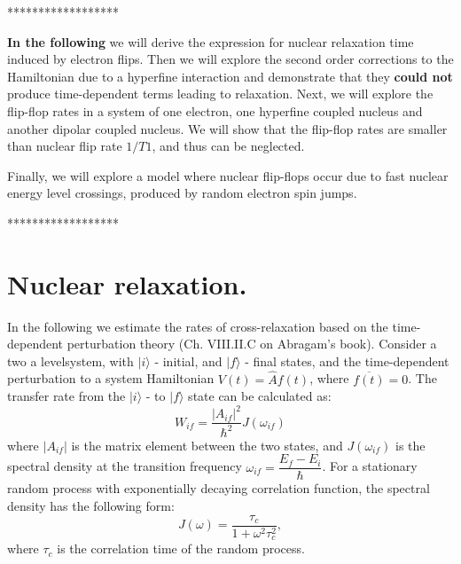 \documentclass[a4paper, 12pt]{article}
\begin{document}
******************

\textbf{In the following} we will derive the expression for nuclear relaxation time induced by electron flips. Then we will explore the second order corrections to the Hamiltonian due to a hyperfine interaction and demonstrate that they \textbf{could not} produce time-dependent terms leading to relaxation. Next, we will explore the flip-flop rates in a system of one electron, one hyperfine coupled nucleus and another dipolar coupled nucleus. We will show that the flip-flop rates are smaller than nuclear flip rate $1/T1$, and thus can be neglected.

Finally, we will explore a model where nuclear flip-flops occur due to fast nuclear energy level crossings, produced by random electron spin jumps.

******************

\section{Nuclear relaxation.}
In the following we estimate the rates of cross-relaxation based on the time-dependent perturbation theory (Ch. VIII.II.C on Abragam's book). Consider a two a levelsystem, with $\vert i \rangle$ - initial, and $\vert f \rangle$ - final states, and the time-dependent perturbation to a system Hamiltonian $V(t) = \hat{A} f(t)$, where $\overline{f(t)} = 0$. The transfer rate from the $\vert i \rangle$ - to  $\vert f \rangle$ state can be calculated as:
\begin{equation} \label{eq:rate}
 W_{if} = \dfrac{ \vert A_{if} \vert ^2  }{\hbar^2} J(\omega_{if}) 
\end{equation}
where $\vert A_{if} \vert$ is the matrix element between the two states, and $J({\omega_{if}})$ is the spectral density at the transition frequency $\omega_{if} = \dfrac{E_f - E_i}{\hbar}$. For a stationary random process with exponentially decaying correlation function, the spectral density has the following form:
\begin{equation}
J(\omega) = \dfrac{\tau_c}{1+\omega^2\tau_c^2}, 
\end{equation} 
where $\tau_c$ is the correlation time of the random process.
\end{document}
